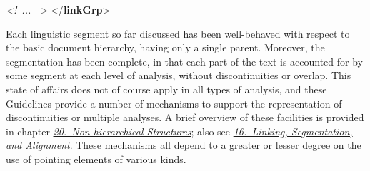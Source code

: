 \begin{shaded}
\mbox{}\newline 
{}\mbox{}\newline 
{}\mbox{}\newline 
{}\mbox{}\newline 
{}\mbox{}\newline 
\textit{<!--... -->}\mbox{}\newline 
{</\textbf{linkGrp}>}\end{shaded}\egroup\par \par
Each linguistic segment so far discussed has been well-behaved with respect to the basic document hierarchy, having only a single parent. Moreover, the segmentation has been complete, in that each part of the text is accounted for by some segment at each level of analysis, without discontinuities or overlap. This state of affairs does not of course apply in all types of analysis, and these Guidelines provide a number of mechanisms to support the representation of discontinuities or multiple analyses. A brief overview of these facilities is provided in chapter \textit{\hyperref[NH]{20.\ Non-hierarchical Structures}}; also see \textit{\hyperref[SA]{16.\ Linking, Segmentation, and Alignment}}. These mechanisms all depend to a greater or lesser degree on the use of pointing elements of various kinds.
